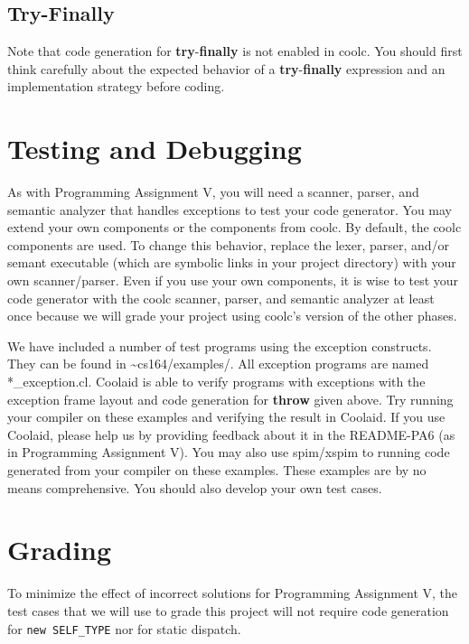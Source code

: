\documentclass[11pt]{article}
\def\U#1{{\sf{}#1}}
\def\S#1{{\tt{}#1}} %
\def\C#1{{\bf{}#1}}
\newcommand{\Throw}{\C{throw}\xspace}
\newcommand{\Try}{\C{try}\xspace}
\newcommand{\Finally}{\C{finally}\xspace}
\newcommand{\Coolaid}{\U{Coolaid}}
\begin{document}
\subsection{Try-Finally}

Note that code generation for \Try-\Finally is not enabled in
\U{coolc}.  You should first think carefully about the expected
behavior of a \Try-\Finally expression and an implementation strategy
before coding.


\section{Testing and Debugging}

As with Programming Assignment V, you will need a scanner, parser, and
semantic analyzer that handles exceptions to test your code
generator. You may extend your own components or the components from
\U{coolc}.  By default, the \U{coolc} components are used.  To change
this behavior, replace the \U{lexer}, \U{parser}, and/or \U{semant} executable
(which are symbolic links in your project directory) with your own
scanner/parser.  Even if you use your own components, it is wise to
test your code generator with the \U{coolc} scanner, parser, and
semantic analyzer at least once because we will grade your project
using \U{coolc}'s version of the other phases.

We have included a number of test programs using the exception
constructs.  They can be found in \U{\~{}cs164/examples/}.  All
exception programs are named \U{*\_exception.cl}.  \Coolaid{} is able
to verify programs with exceptions with the exception frame layout and
code generation for \Throw given above.  Try running your compiler on
these examples and verifying the result in \Coolaid{}.  If you use
\Coolaid{}, please help us by providing feedback about it in the
\U{README-PA6} (as in Programming Assignment V).  You may also use
\U{spim}/\U{xspim} to running code generated from your compiler on
these examples.  These examples are by no means comprehensive. You
should also develop your own test cases.

\section{Grading}

To minimize the effect of incorrect solutions for Programming
Assignment V, the test cases that we will use to grade this project
will not require code generation for \S{new SELF\_TYPE} nor for static
dispatch.
\end{document}
